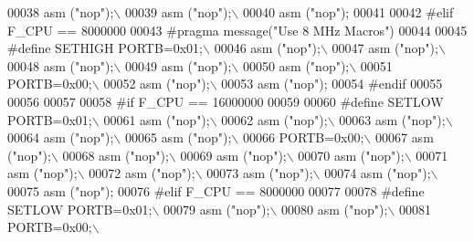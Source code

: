 \begin{DoxyCode}
00038 \textcolor{preprocessor}{               asm ("nop");\(\backslash\)}
00039 \textcolor{preprocessor}{               asm ("nop");\(\backslash\)}
00040 \textcolor{preprocessor}{               asm ("nop");}
00041                
00042 \textcolor{preprocessor}{#elif F\_CPU == 8000000}
00043 \textcolor{preprocessor}{#pragma message("Use 8 MHz Macros")}
00044 
00045 \textcolor{preprocessor}{#define SETHIGH PORTB=0x01;\(\backslash\)}
00046 \textcolor{preprocessor}{               asm ("nop");\(\backslash\)}
00047 \textcolor{preprocessor}{               asm ("nop");\(\backslash\)}
00048 \textcolor{preprocessor}{               asm ("nop");\(\backslash\)}
00049 \textcolor{preprocessor}{               asm ("nop");\(\backslash\)}
00050 \textcolor{preprocessor}{               asm ("nop");\(\backslash\)}
00051 \textcolor{preprocessor}{               PORTB=0x00;\(\backslash\)}
00052 \textcolor{preprocessor}{               asm ("nop");\(\backslash\)}
00053 \textcolor{preprocessor}{               asm ("nop");}
00054 \textcolor{preprocessor}{#endif}
00055 
00056 
00057 
00058 \textcolor{preprocessor}{#if F\_CPU == 16000000}
00059 
00060 \textcolor{preprocessor}{#define SETLOW PORTB=0x01;\(\backslash\)}
00061 \textcolor{preprocessor}{              asm ("nop");\(\backslash\)}
00062 \textcolor{preprocessor}{              asm ("nop");\(\backslash\)}
00063 \textcolor{preprocessor}{              asm ("nop");\(\backslash\)}
00064 \textcolor{preprocessor}{              asm ("nop");\(\backslash\)}
00065 \textcolor{preprocessor}{              asm ("nop");\(\backslash\)}
00066 \textcolor{preprocessor}{              PORTB=0x00;\(\backslash\)}
00067 \textcolor{preprocessor}{              asm ("nop");\(\backslash\)}
00068 \textcolor{preprocessor}{              asm ("nop");\(\backslash\)}
00069 \textcolor{preprocessor}{              asm ("nop");\(\backslash\)}
00070 \textcolor{preprocessor}{              asm ("nop");\(\backslash\)}
00071 \textcolor{preprocessor}{              asm ("nop");\(\backslash\)}
00072 \textcolor{preprocessor}{              asm ("nop");\(\backslash\)}
00073 \textcolor{preprocessor}{              asm ("nop");\(\backslash\)}
00074 \textcolor{preprocessor}{              asm ("nop");\(\backslash\)}
00075 \textcolor{preprocessor}{              asm ("nop");}
00076 \textcolor{preprocessor}{#elif F\_CPU == 8000000}
00077 
00078 \textcolor{preprocessor}{#define SETLOW PORTB=0x01;\(\backslash\)}
00079 \textcolor{preprocessor}{               asm ("nop");\(\backslash\)}
00080 \textcolor{preprocessor}{               asm ("nop");\(\backslash\)}
00081 \textcolor{preprocessor}{               PORTB=0x00;\(\backslash\)}

\end{DoxyCode}
